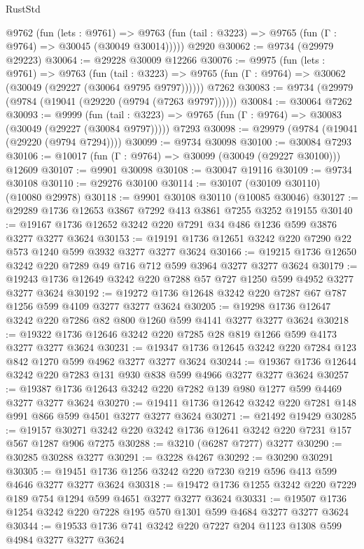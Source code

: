 \begin{lexlean}{RustStd}
\begin{coremodule}
    @9762
      (fun (lets : @9761) =>
      @9763 (fun (tail : @3223) => @9765 (fun (Γ : @9764) => @30045 (@30049 @30014)))))
    @2920
@30062 := @9734 (@29979 @29223)
@30064 := @29228 @30009 @12266
@30076 := @9975
    (fun (lets : @9761) =>
    @9763
      (fun (tail : @3223) =>
      @9765 (fun (Γ : @9764) => @30062 (@30049 (@29227 (@30064 @9795 @9797))))))
    @7262
@30083 := @9734 (@29979 (@9784 (@19041 (@29220 (@9794 (@7263 @9797))))))
@30084 := @30064 @7262
@30093 := @9999
    (fun (tail : @3223) => @9765 (fun (Γ : @9764) => @30083 (@30049 (@29227 (@30084 @9797)))))
    @7293
@30098 := @29979 (@9784 (@19041 (@29220 (@9794 @7294))))
@30099 := @9734 @30098
@30100 := @30084 @7293
@30106 := @10017 (fun (Γ : @9764) => @30099 (@30049 (@29227 @30100))) @12609
@30107 := @9901 @30098
@30108 := @30047 @19116
@30109 := @9734 @30108
@30110 := @29276 @30100
@30114 := @30107 (@30109 @30110) (@10080 @29978)
@30118 := @9901 @30108 @30110 (@10085 @30046)
@30127 := @29289 @1736 @12653 @3867 @7292 @413 @3861 @7255 @3252 @19155
@30140 := @19167 @1736 @12652 @3242 @220 @7291 @34 @486 @1236 @599 @3876 @3277 @3277 @3624
@30153 := @19191 @1736 @12651 @3242 @220 @7290 @22 @573 @1240 @599 @3932 @3277 @3277 @3624
@30166 := @19215 @1736 @12650 @3242 @220 @7289 @49 @716 @712 @599 @3964 @3277 @3277 @3624
@30179 := @19243 @1736 @12649 @3242 @220 @7288 @57 @727 @1250 @599 @4952 @3277 @3277 @3624
@30192 := @19272 @1736 @12648 @3242 @220 @7287 @67 @787 @1256 @599 @4109 @3277 @3277 @3624
@30205 := @19298 @1736 @12647 @3242 @220 @7286 @82 @800 @1260 @599 @4141 @3277 @3277 @3624
@30218 := @19322 @1736 @12646 @3242 @220 @7285 @28 @819 @1266 @599 @4173 @3277 @3277 @3624
@30231 := @19347 @1736 @12645 @3242 @220 @7284 @123 @842 @1270 @599 @4962 @3277 @3277 @3624
@30244 := @19367 @1736 @12644 @3242 @220 @7283 @131 @930 @838 @599 @4966 @3277 @3277 @3624
@30257 := @19387 @1736 @12643 @3242 @220 @7282 @139 @980 @1277 @599 @4469 @3277 @3277 @3624
@30270 := @19411 @1736 @12642 @3242 @220 @7281 @148 @991 @866 @599 @4501 @3277 @3277 @3624
@30271 := @21492 @19429
@30285 := @19157 @30271 @3242 @220 @3242 @1736 @12641 @3242 @220 @7231 @157 @567 @1287 @906 @7275
@30288 := @3210 (@6287 @7277) @3277
@30290 := @30285 @30288 @3277
@30291 := @3228 @4267
@30292 := @30290 @30291
@30305 := @19451 @1736 @1256 @3242 @220 @7230 @219 @596 @413 @599 @4646 @3277 @3277 @3624
@30318 := @19472 @1736 @1255 @3242 @220 @7229 @189 @754 @1294 @599 @4651 @3277 @3277 @3624
@30331 := @19507 @1736 @1254 @3242 @220 @7228 @195 @570 @1301 @599 @4684 @3277 @3277 @3624
@30344 := @19533 @1736 @741 @3242 @220 @7227 @204 @1123 @1308 @599 @4984 @3277 @3277 @3624

\end{coremodule}
\end{lexlean}
